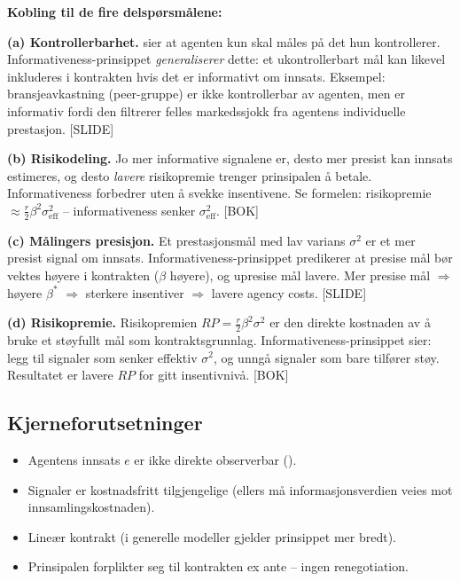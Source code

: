 \textbf{Kobling til de fire delspørsmålene:}

\textbf{(a) Kontrollerbarhet.}  sier at agenten kun skal måles på det hun kontrollerer. Informativeness-prinsippet \emph{generaliserer} dette: et ukontrollerbart mål kan likevel inkluderes i kontrakten hvis det er informativt om innsats. Eksempel: bransjeavkastning (peer-gruppe) er ikke kontrollerbar av agenten, men er informativ fordi den filtrerer felles markedssjokk fra agentens individuelle prestasjon. [SLIDE]

\textbf{(b) Risikodeling.} Jo mer informative signalene er, desto mer presist kan innsats estimeres, og desto \emph{lavere} risikopremie trenger prinsipalen å betale. Informativeness forbedrer  uten å svekke insentivene. Se formelen: risikopremie $\approx \tfrac{r}{2}\beta^2\sigma^2_{\text{eff}}$ -- informativeness senker $\sigma^2_{\text{eff}}$. [BOK]

\textbf{(c) Målingers presisjon.} Et prestasjonsmål med lav varians $\sigma^2$ er et mer presist signal om innsats. Informativeness-prinsippet predikerer at presise mål bør vektes høyere i kontrakten ($\beta$ høyere), og upresise mål lavere. Mer presise mål $\Rightarrow$ høyere $\beta^*$ $\Rightarrow$ sterkere insentiver $\Rightarrow$ lavere agency costs. [SLIDE]

\textbf{(d) Risikopremie.} Risikopremien $RP = \tfrac{r}{2}\beta^2\sigma^2$ er den direkte kostnaden av å bruke et støyfullt mål som kontraktsgrunnlag. Informativeness-prinsippet sier: legg til signaler som senker effektiv $\sigma^2$, og unngå signaler som bare tilfører støy. Resultatet er lavere $RP$ for gitt insentivnivå. [BOK]

\subsection*{Kjerneforutsetninger}
\begin{itemize}
\item Agentens innsats $e$ er ikke direkte observerbar ().
\item Signaler er kostnadsfritt tilgjengelige (ellers må informasjonsverdien veies mot innsamlingskostnaden).
\item Lineær kontrakt (i generelle modeller gjelder prinsippet mer bredt).
\item Prinsipalen forplikter seg til kontrakten ex ante -- ingen renegotiation.
\end{itemize}

